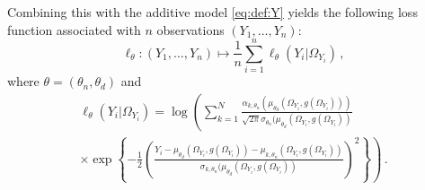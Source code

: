 \documentclass{article}
\begin{document}
Combining this with the additive model  \eqref{eq:def:Y} yields the following loss function associated with $n$ observations $(Y_1,\ldots,Y_n)$:
$$
\ell_{\theta}: (Y_1,\ldots,Y_n) \mapsto \frac{1}{n}\sum_{i=1}^n \ell_{\theta}(Y_i|\Omega_{Y_i})\,,
$$
where $\theta = (\theta_n,\theta_d)$ and
\begin{multline*}
\ell_{\theta}(Y_i|\Omega_{Y_i}) = \log\left(\sum_{k=1}^N\frac{\alpha_{k,\theta_n}(\mu_{\theta_d}(\Omega_{Y_i},g(\Omega_{Y_i})))}{\sqrt{2\pi }\sigma_{\theta_n}(\mu_{\theta_d}(\Omega_{Y_i},g(\Omega_{Y_i}))}\right. \\
\times \left.\exp\left\{-\frac{1}{2}\left(\frac{Y_i-\mu_{\theta_d}(\Omega_{Y_i},g(\Omega_{Y_i}))-  \mu_{k,\theta_n}(\Omega_{Y_i},g(\Omega_{Y_i}))}{\sigma_{k,\theta_n}(\mu_{\theta_d}(\Omega_{Y_i},g(\Omega_{Y_i}))}\right)^2\right\}\right)\,.
\end{multline*}
\end{document}
